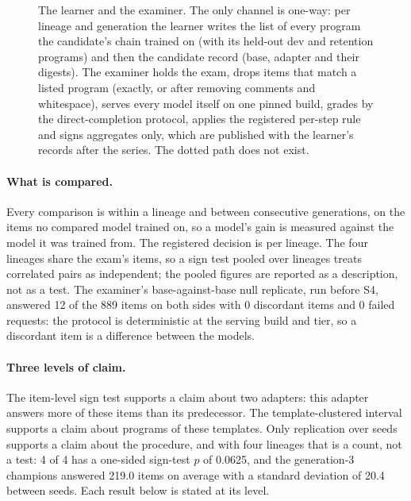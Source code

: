 \begin{figure}[tbp]
\caption{The learner and the examiner. The only channel is one-way: per lineage and
generation the learner writes the list of every program the candidate's chain trained on (with its
held-out dev and retention programs) and then the candidate record (base, adapter and their digests).
The examiner holds the exam, drops items that match a listed program (exactly, or after removing comments and whitespace), serves every model itself
on one pinned build, grades by the direct-completion protocol, applies the registered per-step rule
and signs aggregates only, which are published with the learner's records after the series. The
dotted path does not exist.}\label{fig:examiner}
\end{figure}

\paragraph{What is compared.} Every comparison is within a lineage and between consecutive
generations, on the items no compared model trained on, so a model's gain is measured against the
model it was trained from. The registered decision is per lineage. The four lineages share the exam's
items, so a sign test pooled over lineages treats correlated pairs as independent; the pooled figures
are reported as a description, not as a test. The examiner's base-against-base null replicate, run before S4, answered
12 of the 889 items on both sides with 0 discordant items and 0 failed requests: the protocol is
deterministic at the serving build and tier, so a discordant item is a difference between the
models.


\paragraph{Three levels of claim.} The item-level sign test supports a claim about two adapters: this
adapter answers more of these items than its predecessor. The template-clustered interval supports a
claim about programs of these templates. Only replication over seeds supports a claim about the
procedure, and with four lineages that is a count, not a test: 4 of 4 has a one-sided sign-test $p$ of
0.0625, and the generation-3 champions answered 219.0 items on average with a standard deviation of 20.4
between seeds. Each result below is stated at its level.
